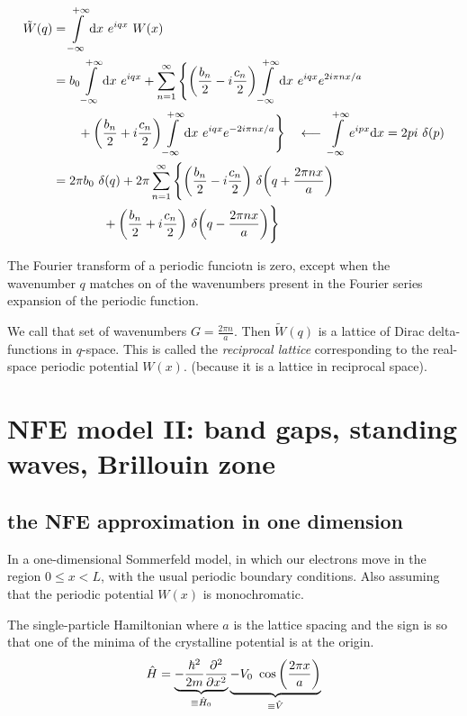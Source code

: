 \documentclass[10pt, a4paper, twocolumn]{article}
\newcommand{\larr}{\ensuremath{\longleftarrow\ }}
\newcommand{\intinf}{\ensuremath{\int\limits_{-\infty}^{+\infty}}}
\begin{document}
\begin{equation*}
\begin{aligned}
\tilde W (q) &= \intinf \dd x\ e^{iqx}\ W(x)
\\&= b_0 \intinf \dd x\ e^{iqx} + \sum _{n=1}^\infty
\Bigg\{ \qty(\frac{b_n}{2}-i\frac{c_n}{2})
\intinf \dd x\ e^{iqx}e^{2i\pi nx/a}
\\&\qquad
+ \qty(\frac{b_n}{2}+i\frac{c_n}{2})
\intinf \dd x\ e^{iqx}e^{-2i\pi nx/a}
\Bigg\}
\quad \larr \intinf e^{ipx} \dd x = 2pi\ \delta (p)
\\&= 2\pi b_0 \ \delta (q) + 2\pi \sum _{n=1}^\infty
\Bigg\{
\qty(\frac{b_n}{2}-i\frac{c_n}{2})
\ \delta \qty(q+\frac{2\pi n x}{a})
\\&\qquad\qquad
+ \qty(\frac{b_n}{2}+i\frac{c_n}{2})
\ \delta \qty(q-\frac{2\pi n x}{a}) \Bigg\}
\end{aligned}
\end{equation*}

The Fourier transform of a periodic funciotn is zero, except when the wavenumber $q$ matches on of the wavenumbers present in the Fourier series expansion of the periodic function.

We call that set of wavenumbers $G = \frac{2\pi n}{a}$. Then $\tilde W (q)$ is a lattice of Dirac delta-functions in $q$-space. This is called the \emph{reciprocal lattice} corresponding to the real-space periodic potential $W(x)$. (because it is a lattice in reciprocal space).

\section{NFE model II: band gaps, standing waves, Brillouin zone}

\subsection{the NFE approximation in one dimension}

In a one-dimensional Sommerfeld model, in which our electrons move in the region $0\leq x<L$, with the usual periodic boundary conditions. Also assuming that the periodic potential $W(x)$ is monochromatic.

The single-particle Hamiltonian where $a$ is the lattice spacing and the sign is so that one of the minima of the crystalline potential is at the origin.
\[\hat H =
\underbrace{-\frac{\hbar ^2}{2m}\pdv[2]{x}}
_{\equiv \hat H _0}
\underbrace{-V_0 \ \cos\qty(\frac{2\pi x}{a})}
_{\equiv \hat V} \]
\end{document}
